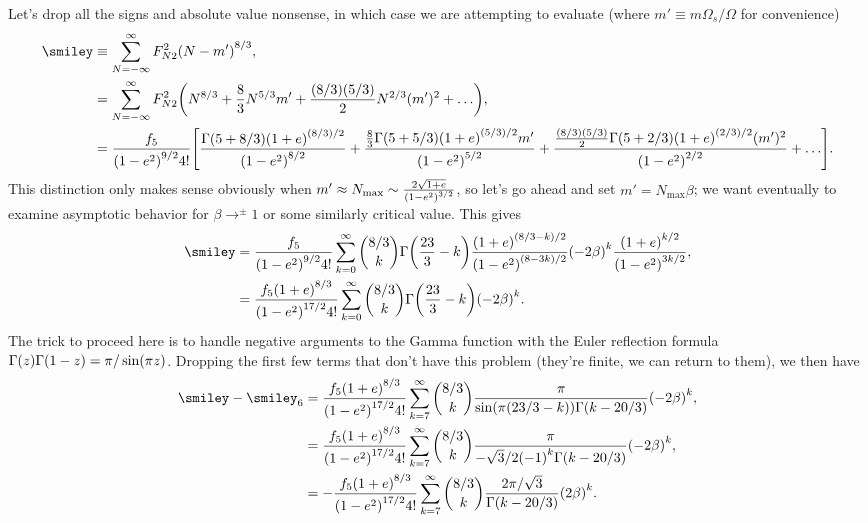 \documentclass[11pt,
        usenames, %
        dvipsnames %
    ]{article}
\DeclarePairedDelimiter\p{\lparen}{\rparen}
\DeclarePairedDelimiter\s{\lbrack}{\rbrack}
\begin{document}
Let's drop all the signs and absolute value nonsense, in which case we are
attempting to evaluate (where $m' \equiv m\Omega_s / \Omega$ for convenience)
\begin{align}
    \smiley
        &\equiv \sum\limits_{N = -\infty}^\infty F_{N2}^2 \p*{N - m'}^{8/3}
            ,\\
        &= \sum\limits_{N = -\infty}^\infty
            F_{N2}^2\p*{N^{8/3} + \frac{8}{3}N^{5/3}m'
                + \frac{(8/3)(5/3)}{2}N^{2/3}(m')^2 + \dots},\\
        &= \frac{f_5}{\p*{1 - e^2}^{9/2}4!}\s*{
            \frac{\Gamma\p*{5 + 8/3}\p*{1 + e}^{(8/3) / 2}}{\p*{1 - e^2}^{8/2}}
                + \frac{\frac{8}{3}\Gamma\p*{5 + 5/3}\p*{1 + e}^{(5/3) / 2}m'}{
                    \p*{1 - e^2}^{5/2}}
                + \frac{\frac{(8/3)(5/3)}{2}\Gamma\p*{5 + 2/3}\p*{1 + e}^{(2/3)
                    / 2} (m')^2}{\p*{1 - e^2}^{2/2}}
                + \dots}.
\end{align}
This distinction only makes sense obviously when $m' \approx N_{\max} \sim
\frac{2\sqrt{1 + e}}{\p*{1 - e^2}^{3/2}}$, so let's go ahead and set $m' =
N_{\max}\beta$; we want eventually to examine asymptotic behavior for $\beta
\to^{\pm} 1$ or some similarly critical value. This gives
\begin{align}
    \smiley
        &= \frac{f_5}{\p*{1 - e^2}^{9/2}4!}\sum\limits_{k = 0}^\infty
            \binom{8/3}{k}\Gamma\p*{\frac{23}{3} - k}
                \frac{\p*{1 + e}^{(8/3 - k) / 2}}{
                    \p*{1 - e^2}^{(8 - 3k)/2}}
                \p*{-2\beta}^k\frac{\p*{1 + e}^{k / 2}}{\p*{1 - e^2}^{3k / 2}},\\
        &= \frac{f_5\p*{1 + e}^{8/3}}{\p*{1 - e^2}^{17/2}4!}
            \sum\limits_{k = 0}^\infty
            \binom{8/3}{k}\Gamma\p*{\frac{23}{3} - k}\p*{-2\beta}^k.
\end{align}
The trick to proceed here is to handle negative arguments to the Gamma function
with the Euler reflection formula $\Gamma(z) \Gamma\p*{1 - z} = \pi/\sin\p*{\pi
z}$. Dropping the first few terms that don't have this problem (they're finite,
we can return to them), we then have
\begin{align}
    \smiley - \smiley_6
        &= \frac{f_5\p*{1 + e}^{8/3}}{\p*{1 - e^2}^{17/2}4!}
            \sum\limits_{k = 7}^\infty \binom{8/3}{k}
            \frac{\pi}{\sin \p*{\pi\p*{23/3 - k}}
                \Gamma\p*{k - 20/3}}\p*{-2\beta}^k,\\
        &= \frac{f_5\p*{1 + e}^{8/3}}{\p*{1 - e^2}^{17/2}4!}
            \sum\limits_{k = 7}^\infty \binom{8/3}{k}
            \frac{\pi}{-\sqrt{3}/2\p*{-1}^k
                \Gamma\p*{k - 20/3}}\p*{-2\beta}^k,\\
        &= -\frac{f_5\p*{1 + e}^{8/3}}{\p*{1 - e^2}^{17/2}4!}
            \sum\limits_{k = 7}^\infty \binom{8/3}{k}
            \frac{2\pi/\sqrt{3}}{\Gamma\p*{k - 20/3}}\p*{2\beta}^k.
\end{align}
\end{document}

